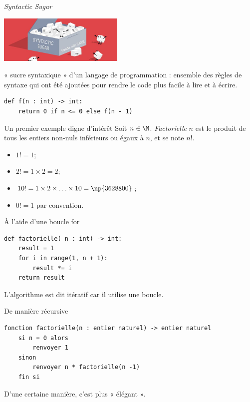 \documentclass[10pt]{nsibeamer}
\begin{document}
\begin{frame}[fragile]{\textit{Syntactic Sugar}}
    \begin{center}
        \includegraphics[width=6cm]{img/syntactic_sugar}
    \end{center}
    « sucre syntaxique » d'un langage de programmation : ensemble des règles de syntaxe qui ont été ajoutées pour rendre le code plus facile à lire et à écrire.\pause
    \begin{verbatim}
def f(n : int) -> int:
    return 0 if n <= 0 else f(n - 1)
\end{verbatim}
\end{frame}

%


\begin{frame}[fragile]{Un premier exemple digne d'intérêt}
    Soit $n\in\N$. \textit{Factorielle} $n$ est le produit de tous les entiers non-nuls inférieurs ou égaux à $n$, et se note $n!$.\pause
    \begin{itemize}
        \item $1!=1$;\pause
        \item $2!=1\times2 = 2$;\pause
        \item $10!=1\times 2\times \ldots \times 10 = \np{3628800}$;\pause
        \item $0! = 1$ par convention.
    \end{itemize}
\end{frame}

%

\begin{frame}[fragile]{À l'aide d'une boucle for}
    \begin{verbatim}
def factorielle( n : int) -> int:
    result = 1
    for i in range(1, n + 1):
        result *= i
    return result
\end{verbatim}
    \pause
    L'algorithme est dit \alert{itératif} car il utilise une boucle.
\end{frame}

%

\begin{frame}[fragile]{De manière récursive}
    \scriptsize
    \begin{verbatim}
fonction factorielle(n : entier naturel) -> entier naturel
    si n = 0 alors
        renvoyer 1
    sinon
        renvoyer n * factorielle(n -1)
    fin si
\end{verbatim}
    \normalsize
    
    \pause
    D'une certaine manière, c'est plus « élégant ».
\end{frame}
\end{document}
